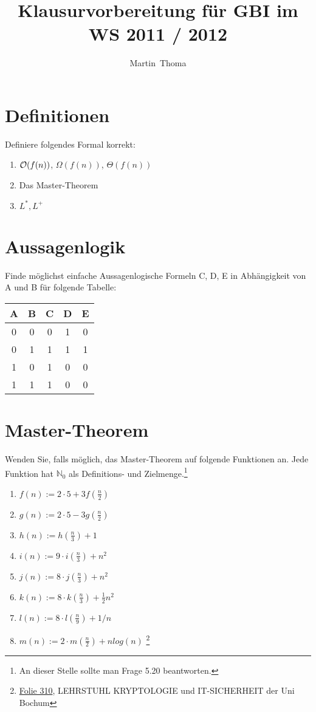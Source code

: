 \documentclass[a4paper,12pt]{article}
\newcommand{\Nachname}{Thoma}
\newcommand{\Vorname}{Martin}
\begin{document}
\title{Klausurvorbereitung für GBI im WS 2011 / 2012}
\author{\Vorname~\Nachname}

\section{Definitionen}
Definiere folgendes Formal korrekt:

\begin{enumerate}
  \item ${\cal O}(f(n))$,  $\Omega(f(n))$,  $\Theta(f(n))$
  \item Das Master-Theorem
  \item $L^*, L^+$
\end{enumerate}

\section{Aussagenlogik}
Finde möglichst einfache Aussagenlogische Formeln C, D, E in Abhängigkeit von A
und B für folgende Tabelle:
\begin{table}[h]
	\begin{tabular}{| c | c  || c | c | c |}
	\hline
	\textbf{A} & \textbf{B} & C & D & E\\
	\hline
	\hline
	0 & 0 & 0 & 1 & 0\\
	\hline
	0 & 1 & 1 & 1 & 1\\
	\hline
	1 & 0 & 1 & 0 & 0\\
	\hline
	1 & 1 & 1 & 0 & 0\\
	\hline
	\end{tabular}
\end{table}

\section{Master-Theorem}
Wenden Sie, falls möglich, das Master-Theorem auf folgende Funktionen an. Jede
Funktion hat $\mathbb{N}_0$ als Definitions- und Zielmenge.\footnote{An dieser Stelle sollte man Frage 5.20 beantworten.}
\begin{enumerate}
  \item $f(n) := 2 \cdot 5 + 3 f(\frac{n}{2})$
  \item $g(n) := 2 \cdot 5 - 3 g(\frac{n}{2})$
  \item $h(n) := h(\frac{n}{3}) + 1$
  \item $i(n) := 9 \cdot i(\frac{n}{3}) + n^2$
  \item $j(n) := 8 \cdot j(\frac{n}{3}) + n^2$
  \item $k(n) := 8 \cdot k(\frac{n}{3}) + \frac{1}{2} n^2$
  \item $l(n) := 8 \cdot l(\frac{n}{9}) + 1/n$
  \item $m(n) := 2 \cdot m(\frac{n}{2}) + n log(n)$ \footnote{\href{http://www.cits.rub.de/imperia/md/content/may/dima08/26_erzeugende.pdf}{Folie 310}, LEHRSTUHL KRYPTOLOGIE und IT-SICHERHEIT der Uni Bochum}
\end{enumerate}
\end{document}
